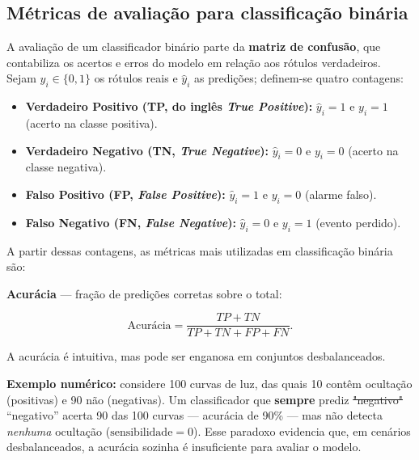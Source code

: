 \documentclass[msc]{on} %
\makeatletter
\providecommand{\DIFaddtex}[1]{{\protect\color{red}#1}} %
\providecommand{\DIFdeltex}[1]{{\protect\color{red}\sout{#1}}} %
\providecommand{\DIFaddbegin}{} %
\providecommand{\DIFaddend}{} %
\providecommand{\DIFdelbegin}{} %
\providecommand{\DIFdelend}{} %
\providecommand{\DIFadd}[1]{\texorpdfstring{\DIFaddtex{#1}}{#1}} %
\providecommand{\DIFdel}[1]{\texorpdfstring{\DIFdeltex{#1}}{}} %
\let\sout@orig\sout %
\renewcommand{\sout}[1]{\ifmmode\text{\sout@orig{\ensuremath{#1}}}\else\sout@orig{#1}\fi} %
\makeatother
\begin{document}
\subsection{Métricas de avaliação para classificação binária}
\label{sec:metricas_avaliacao}

A avaliação de um classificador binário parte da \textbf{matriz de confusão}, que contabiliza os acertos e erros do modelo em relação aos rótulos verdadeiros. Sejam \(y_i \in \{0,1\}\) os rótulos reais e \(\hat{y}_i\) as predições; definem-se quatro contagens:

\begin{itemize}
	\item \textbf{Verdadeiro Positivo (TP\DIFaddbegin \DIFadd{, do inglês }\textit{\DIFadd{True Positive}}\DIFaddend ):} $\hat{y}_i = 1$ e $y_i = 1$ (acerto na classe positiva).
	\item \textbf{Verdadeiro Negativo (TN\DIFaddbegin \DIFadd{, }\textit{\DIFadd{True Negative}}\DIFaddend ):} $\hat{y}_i = 0$ e $y_i = 0$ (acerto na classe negativa).
	\item \textbf{Falso Positivo (FP\DIFaddbegin \DIFadd{, }\textit{\DIFadd{False Positive}}\DIFaddend ):} $\hat{y}_i = 1$ e $y_i = 0$ (alarme falso).
	\item \textbf{Falso Negativo (FN\DIFaddbegin \DIFadd{, }\textit{\DIFadd{False Negative}}\DIFaddend ):} $\hat{y}_i = 0$ e $y_i = 1$ (evento perdido).
\end{itemize}

A partir dessas contagens, as métricas mais utilizadas em classificação binária são:

\textbf{Acurácia} --- fração de predições corretas sobre o total:

\begin{equation}
\text{Acurácia} = \frac{TP + TN}{TP + TN + FP + FN}.
\end{equation}

A acurácia é intuitiva, mas pode ser enganosa em conjuntos desbalanceados. 

\textbf{Exemplo numérico:} considere 100 curvas de luz, das quais 10 contêm ocultação (positivas) e 90 não (negativas). Um classificador que \textbf{sempre} prediz \DIFdelbegin \DIFdel{"negativo" }\DIFdelend \DIFaddbegin \DIFadd{``negativo'' }\DIFaddend acerta 90 das 100 curvas --- acurácia de 90\% --- mas não detecta \textit{nenhuma} ocultação ($\text{sensibilidade} = 0$). Esse paradoxo evidencia que, em cenários desbalanceados, a acurácia sozinha é insuficiente para avaliar o modelo.
\end{document}
